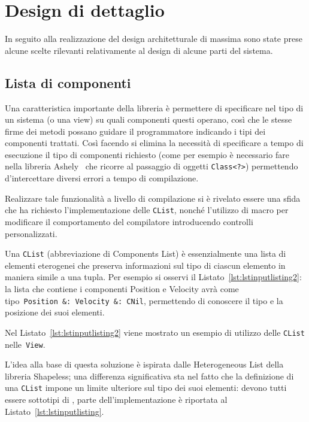 \chapter{Design di dettaglio}\label{ch:design-di-dettaglio}
In seguito alla realizzazione del design architetturale di massima sono state prese
alcune scelte rilevanti relativamente al design di alcune parti del sistema.

\section{Lista di componenti}\label{sec:lista-di-componenti}
Una caratteristica importante della libreria è permettere di specificare nel tipo di un sistema (o una view)
su quali componenti questi operano, così che le stesse firme dei metodi possano guidare il programmatore indicando i
tipi dei componenti trattati.
Così facendo si elimina la necessità di specificare a tempo di esecuzione il tipo di componenti richiesto (come per
esempio è necessario fare nella libreria Ashely~\cite{ashley} che ricorre al passaggio di oggetti \texttt{Class<?>})
permettendo d'intercettare diversi errori a tempo di compilazione.

Realizzare tale funzionalità a livello di compilazione si è rivelato essere una sfida che ha richiesto l’implementazione
delle \texttt{CList}, nonché l’utilizzo di macro per modificare il comportamento del compilatore introducendo controlli
personalizzati.

Una \texttt{CList} (abbreviazione di Components List) è essenzialmente una lista di elementi eterogenei che preserva
informazioni sul tipo di ciascun elemento in maniera simile a una tupla.
Per esempio si osservi il Listato~\ref{lst:lstinputlisting2}: la lista che contiene
i componenti Position e Velocity avrà come tipo~\texttt{Position~\&:~Velocity~\&:~CNil}, permettendo di conoscere il
tipo e la posizione dei suoi elementi.

Nel Listato~\ref{lst:lstinputlisting2} viene mostrato un esempio di utilizzo delle \texttt{CList} nelle~\texttt{View}.


L’idea alla base di questa soluzione è ispirata dalle Heterogeneous List della libreria
Shapeless\cite{shapeless}; una differenza significativa sta nel fatto che la definizione di una \texttt{CList} impone un
limite ulteriore sul tipo dei suoi elementi: devono tutti essere sottotipi di \Component, parte dell’implementazione è
riportata al Listato~\ref{lst:lstinputlisting}.

